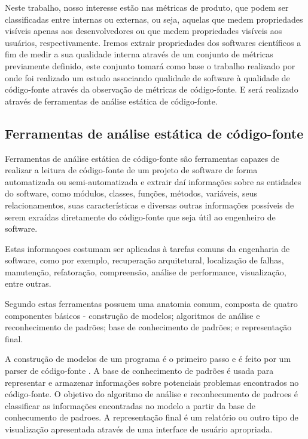 \documentclass[qual, classic, a4paper]{ufbathesis}
\begin{document}
Neste trabalho, nosso interesse estão nas métricas de produto, que podem ser
classificadas entre internas ou externas, ou seja, aquelas que medem
propriedades visíveis apenas aos desenvolvedores ou que medem propriedades
visíveis aos usuários, respectivamente. Iremos extrair propriedades dos
softwares científicos a fim de medir a sua qualidade interna através de um
conjunto de métricas previamente definido, este conjunto tomará como base o
trabalho realizado por  onde foi realizado um estudo
associando qualidade de software à qualidade de código-fonte através da
observação de métricas de código-fonte. E será realizado através de
ferramentas de análise estática de código-fonte.

\subsection{Ferramentas de análise estática de código-fonte}

Ferramentas de análise estática de código-fonte são ferramentas capazes de
realizar a leitura de código-fonte de um projeto de software de forma
automatizada ou semi-automatizada e extrair daí informações sobre as entidades
do software, como módulos, classes, funções, métodos, variáveis, seus
relacionamentos, suas características e diversas outras informações possíveis
de serem exraídas diretamente do código-fonte que seja útil ao engenheiro de
software.

Estas informaçoes costumam ser aplicadas à tarefas comuns da engenharia de
software, como por exemplo, recuperação arquitetural, localização de falhas,
manutenção, refatoração, compreensão, análise de performance, visualização,
entre outras.

Segundo  estas ferramentas possuem uma
anatomia comum, composta de quatro componentes básicos - construção de
modelos; algoritmos de análise e reconhecimento de padrões; base de
conhecimento de padrões; e representação final.

A construção de modelos de um programa é o primeiro passo e é feito por um
parser de código-fonte \cite{Binkley2007}. A base de conhecimento de padrões é
usada para representar e armazenar informações sobre potenciais problemas
encontrados no código-fonte. O objetivo do algoritmo de análise e
reconhecumento de padroes é classificar as informações encontradas no modelo a
partir da base de conhecumento de padroes. A representação final é um
relatório ou outro tipo de visualização apresentada através de uma interface
de usuário apropriada.
\end{document}
